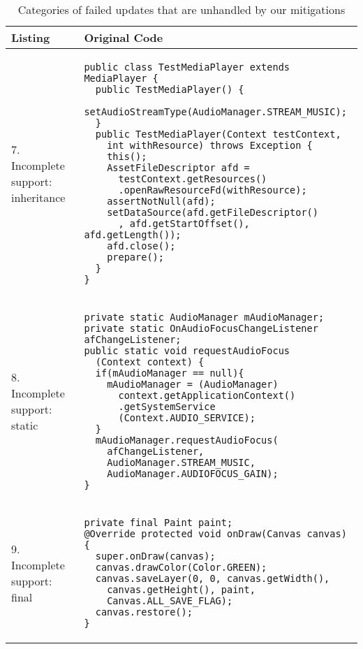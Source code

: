 \begin{table}
	\caption{Categories of failed updates that are unhandled by our mitigations}\label{tab:mitigatefail}
\centering
\begin{tabular}{|p{}|p{}|}
\hline
\textbf{Listing}
  &
  \textbf{Original Code}
 \\ \hline
7. Incomplete support: inheritance
&
\begin{lstlisting}
public class TestMediaPlayer extends MediaPlayer {
  public TestMediaPlayer() {
    setAudioStreamType(AudioManager.STREAM_MUSIC);
  }
  public TestMediaPlayer(Context testContext,
    int withResource) throws Exception {
    this();
    AssetFileDescriptor afd =
      testContext.getResources()
      .openRawResourceFd(withResource);
    assertNotNull(afd);
    setDataSource(afd.getFileDescriptor()
      , afd.getStartOffset(), afd.getLength());
    afd.close();
    prepare();
  }
}
\end{lstlisting}
\\ \hline
8. Incomplete support: static
&
\begin{lstlisting}
private static AudioManager mAudioManager;
private static OnAudioFocusChangeListener afChangeListener;
public static void requestAudioFocus
  (Context context) {
  if(mAudioManager == null){
    mAudioManager = (AudioManager)
      context.getApplicationContext()
      .getSystemService
      (Context.AUDIO_SERVICE);
  }
  mAudioManager.requestAudioFocus(
    afChangeListener,
    AudioManager.STREAM_MUSIC,
    AudioManager.AUDIOFOCUS_GAIN);
}
\end{lstlisting}
\\ \hline
9. Incomplete support: final
&
\begin{lstlisting}
private final Paint paint;
@Override protected void onDraw(Canvas canvas) {
  super.onDraw(canvas);
  canvas.drawColor(Color.GREEN);
  canvas.saveLayer(0, 0, canvas.getWidth(),
    canvas.getHeight(), paint,
    Canvas.ALL_SAVE_FLAG);
  canvas.restore();
}
\end{lstlisting}
\\ \hline
 \end{tabular}
 \end{table}

